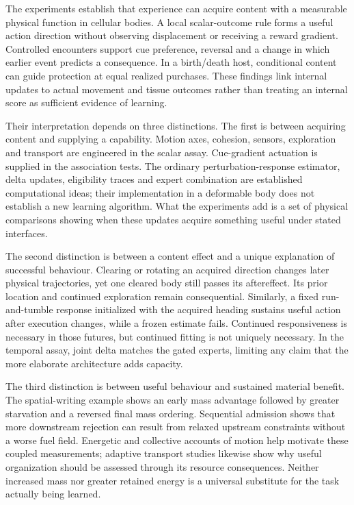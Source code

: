 The experiments establish that experience can acquire content with a measurable physical function in cellular bodies. A local scalar-outcome rule forms a useful action direction without observing displacement or receiving a reward gradient. Controlled encounters support cue preference, reversal and a change in which earlier event predicts a consequence. In a birth/death host, conditional content can guide protection at equal realized purchases. These findings link internal updates to actual movement and tissue outcomes rather than treating an internal score as sufficient evidence of learning.

Their interpretation depends on three distinctions. The first is between acquiring content and supplying a capability. Motion axes, cohesion, sensors, exploration and transport are engineered in the scalar assay. Cue-gradient actuation is supplied in the association tests. The ordinary perturbation-response estimator, delta updates, eligibility traces and expert combination are established computational ideas\cite{sutton,florian,izhikevich,fremaux,williams,baxter}; their implementation in a deformable body does not establish a new learning algorithm. What the experiments add is a set of physical comparisons showing when these updates acquire something useful under stated interfaces.

The second distinction is between a content effect and a unique explanation of successful behaviour. Clearing or rotating an acquired direction changes later physical trajectories, yet one cleared body still passes its aftereffect. Its prior location and continued exploration remain consequential. Similarly, a fixed run-and-tumble response initialized with the acquired heading sustains useful action after execution changes, while a frozen estimate fails. Continued responsiveness is necessary in those futures, but continued fitting is not uniquely necessary. In the temporal assay, joint delta matches the gated experts, limiting any claim that the more elaborate architecture adds capacity.

The third distinction is between useful behaviour and sustained material benefit. The spatial-writing example shows an early mass advantage followed by greater starvation and a reversed final mass ordering. Sequential admission shows that more downstream rejection can result from relaxed upstream constraints without a worse fuel field. Energetic and collective accounts of motion help motivate these coupled measurements\cite{schweitzer,circle,tjhung,tonertu}; adaptive transport studies likewise show why useful organization should be assessed through its resource consequences\cite{tero,teronetwork,liu,prindle,alimflow,alimsignal,nakajima2015}. Neither increased mass nor greater retained energy is a universal substitute for the task actually being learned.

